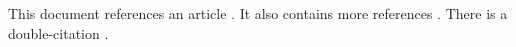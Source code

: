 \documentclass{article}
\begin{document}
This document references an article \cite{Hoc2014}.
It also contains more references \cite{HocShm2012, Shm2019}.
There is a double-citation \cite{zbl:1337.28015}.
\printbibliography
\end{document}
